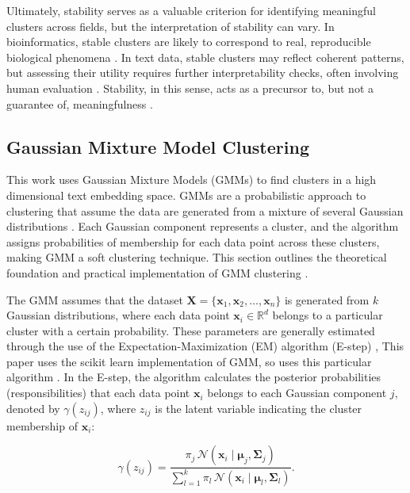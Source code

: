 \documentclass{article}
\begin{document}
Ultimately, stability serves as a valuable criterion for identifying meaningful clusters across fields, but the interpretation of stability can vary. In bioinformatics, stable clusters are likely to correspond to real, reproducible biological phenomena \cite{yu2022benchmarking}. In text data, stable clusters may reflect coherent patterns, but assessing their utility requires further interpretability checks, often involving human evaluation \cite{lord2017using}. Stability, in this sense, acts as a precursor to, but not a guarantee of, meaningfulness \cite{kuncheva2006evaluation}.




\subsection*{Gaussian Mixture Model Clustering}

This work uses Gaussian Mixture Models (GMMs) to find clusters in a high dimensional text embedding space.  GMMs are a probabilistic approach to clustering that assume the data are generated from a mixture of several Gaussian distributions \cite{21GaussianMixture}. Each Gaussian component represents a cluster, and the algorithm assigns probabilities of membership for each data point across these clusters, making GMM a soft clustering technique. This section outlines the theoretical foundation and practical implementation of GMM clustering \cite{mit_ml_notes_2015, JMLR:v25:23-1245, ghosh2018emnotes}.


The GMM assumes that the dataset $\mathbf{X} = \{\mathbf{x}_1, \mathbf{x}_2, \dots, \mathbf{x}_n\}$ is generated from $k$ Gaussian distributions, where each data point $\mathbf{x}_i \in \mathbb{R}^d$ belongs to a particular cluster with a certain probability.  These parameters are generally estimated through the use of the Expectation-Maximization (EM) algorithm (E-step) \cite{hosseiniAlternativeEMGaussian2020}, This paper uses the scikit learn implementation of GMM, so uses this particular algorithm \cite{21GaussianMixture}. In the E-step, the algorithm calculates the posterior probabilities (responsibilities) that each data point $\mathbf{x}_i$ belongs to each Gaussian component $j$, denoted by $\gamma(z_{ij})$, where $z_{ij}$ is the latent variable indicating the cluster membership of $\mathbf{x}_i$:

\begin{equation}
\gamma(z_{ij}) = \frac{\pi_j \, \mathcal{N}(\mathbf{x}_i \mid \boldsymbol{\mu}_j, \boldsymbol{\Sigma}_j)}{\sum_{l=1}^{k} \pi_l \, \mathcal{N}(\mathbf{x}_i \mid \boldsymbol{\mu}_l, \boldsymbol{\Sigma}_l)}.
\label{eq:e-step}
\end{equation}
\end{document}
